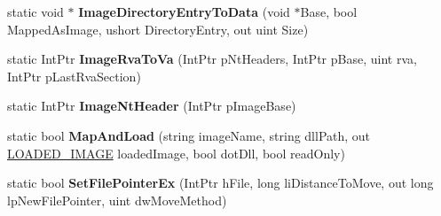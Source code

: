 \begin{DoxyCompactItemize}
static void $\ast$ {\bfseries Image\+Directory\+Entry\+To\+Data} (void $\ast$Base, bool Mapped\+As\+Image, ushort Directory\+Entry, out uint Size)
\item 
\mbox{\label{class_class_library_server_1_1_struct_1_1_interop_a3bd560e9cad352d3e249482a71928621}} 
static Int\+Ptr {\bfseries Image\+Rva\+To\+Va} (Int\+Ptr p\+Nt\+Headers, Int\+Ptr p\+Base, uint rva, Int\+Ptr p\+Last\+Rva\+Section)
\item 
\mbox{\label{class_class_library_server_1_1_struct_1_1_interop_ab56255d4982a9748c444719d10f5219f}} 
static Int\+Ptr {\bfseries Image\+Nt\+Header} (Int\+Ptr p\+Image\+Base)
\item 
\mbox{\label{class_class_library_server_1_1_struct_1_1_interop_ac04dbcdb580a0adf5022c702399d8709}} 
static bool {\bfseries Map\+And\+Load} (string image\+Name, string dll\+Path, out \mbox{\hyperlink{struct_class_library_server_1_1_struct_1_1_l_o_a_d_e_d___i_m_a_g_e}{L\+O\+A\+D\+E\+D\+\_\+\+I\+M\+A\+GE}} loaded\+Image, bool dot\+Dll, bool read\+Only)
\item 
\mbox{\label{class_class_library_server_1_1_struct_1_1_interop_a5e23c3984cc77dd0cd5cd676857e7b38}} 
static bool {\bfseries Set\+File\+Pointer\+Ex} (Int\+Ptr h\+File, long li\+Distance\+To\+Move, out long lp\+New\+File\+Pointer, uint dw\+Move\+Method)
\end{DoxyCompactItemize}
